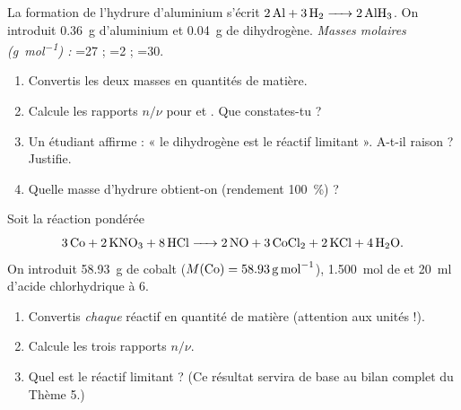 \documentclass[11pt,a4paper]{article}
\begin{document}
\begin{exo}
La formation de l'hydrure d'aluminium s'écrit $\ce{2 Al + 3 H2 -> 2 AlH3}$. On introduit
\SI{0,36}{\gram} d'aluminium et \SI{0,04}{\gram} de dihydrogène.
\emph{Masses molaires (\si{\gram\per\mole}) :} =27 ; =2 ; =30.
\begin{enumerate}[label=\textbf{\alph*)},leftmargin=2em,topsep=1pt,itemsep=1.5pt]
  \item Convertis les deux masses en quantités de matière.
  \item Calcule les rapports $n/\nu$ pour  et . Que constates-tu ?
  \item Un étudiant affirme : « le dihydrogène est le réactif limitant ». A-t-il raison ? Justifie.
  \item Quelle masse d'hydrure  obtient-on (rendement \SI{100}{\percent}) ?
\end{enumerate}
\end{exo}

\begin{exo}
Soit la réaction pondérée
\[ \ce{3 Co + 2 KNO3 + 8 HCl -> 2 NO + 3 CoCl2 + 2 KCl + 4 H2O}. \]
On introduit \SI{58,93}{\gram} de cobalt ($M(\ce{Co})=\SI{58,93}{\gram\per\mole}$), \SI{1,500}{\mole}
de  et \SI{20}{\milli\litre} d'acide chlorhydrique à \SI{6}{\Molar}.
\begin{enumerate}[label=\textbf{\alph*)},leftmargin=2em,topsep=1pt,itemsep=1.5pt]
  \item Convertis \emph{chaque} réactif en quantité de matière (attention aux unités !).
  \item Calcule les trois rapports $n/\nu$.
  \item Quel est le réactif limitant ? (Ce résultat servira de base au bilan complet du Thème 5.)
\end{enumerate}
\end{exo}
\end{document}
